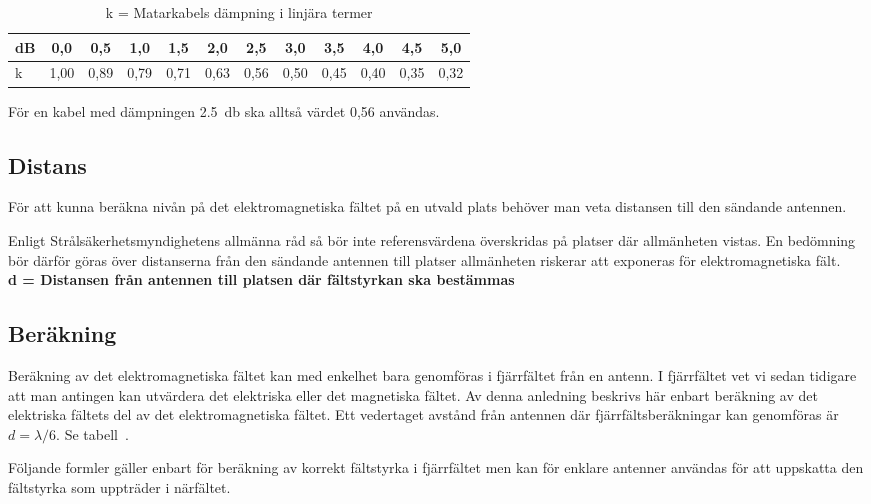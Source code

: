 \begin{table*}[ht]
  \begin{center}
    \begin{tabular}{|l|c|c|c|c|c|c|c|c|c|c|c|}
	\hline
	dB & 0,0  & 0,5  & 1,0  & 1,5  & 2,0  & 2,5  & 3,0  & 3,5  & 4,0  & 4,5  & 5,0 \\ \hline
	k  & 1,00 & 0,89 & 0,79 & 0,71 & 0,63 & 0,56 & 0,50 & 0,45 & 0,40 & 0,35 & 0,32 \\ \hline
    \end{tabular}
    \caption{k = Matarkabels dämpning i linjära termer}
    \label{tab:feedannut}
  \end{center}
\end{table*}

För en kabel med dämpningen \qty{2,5}{\decibel} ska alltså värdet 0,56 användas.

\subsection{Distans}

För att kunna beräkna nivån på det elektromagnetiska fältet på en utvald plats
behöver man veta distansen till den sändande antennen.

Enligt Strålsäkerhetsmyndighetens allmänna råd så bör inte referensvärdena
överskridas på platser där allmänheten vistas.
En bedömning bör därför göras över distanserna från den sändande antennen till
platser allmänheten riskerar att exponeras för elektromagnetiska fält.
\\[1ex] %
\noindent\textbf{d = Distansen från antennen till platsen där fältstyrkan ska bestämmas}

\subsection{Beräkning}

Beräkning av det elektromagnetiska fältet kan med enkelhet bara
genomföras i fjärrfältet från en antenn.
I fjärrfältet vet vi sedan tidigare att man antingen kan utvärdera det
elektriska eller det magnetiska fältet.
Av denna anledning beskrivs här enbart beräkning av det elektriska fältets del av
det elektromagnetiska fältet.
Ett vedertaget avstånd från antennen där fjärrfältsberäkningar kan genomföras är
\(d=\lambda / 6\).
Se tabell~.

Följande formler gäller enbart för beräkning av korrekt fältstyrka i
fjärrfältet men kan för enklare antenner användas för att uppskatta den
fältstyrka som uppträder i närfältet.

